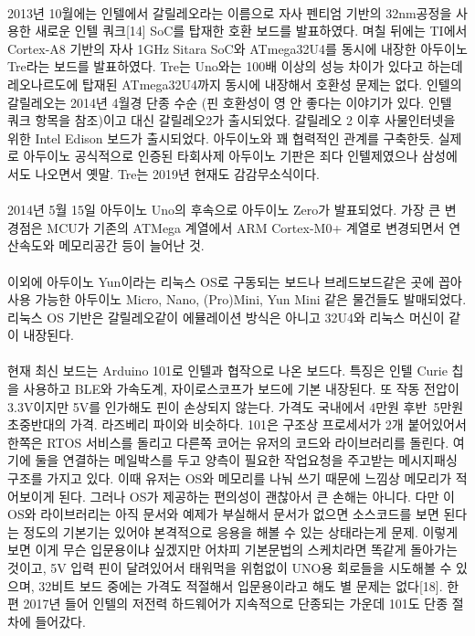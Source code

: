 \documentclass[12pt, a4paper, oneside]{book}
\begin{document}
\paragraph{}
2013년 10월에는 인텔에서 갈릴레오라는 이름으로 자사 펜티엄 기반의 32nm공정을 사용한 새로운 인텔 쿼크[14] SoC를 탑재한 호환 보드를 발표하였다. 
며칠 뒤에는 TI에서 Cortex-A8 기반의 자사 1GHz Sitara SoC와 ATmega32U4를 동시에 내장한 아두이노 Tre라는 보드를 발표하였다. 
Tre는 Uno와는 100배 이상의 성능 차이가 있다고 하는데 레오나르도에 탑재된 ATmega32U4까지 동시에 내장해서 호환성 문제는 없다. 
인텔의 갈릴레오는 2014년 4월경 단종 수순 (핀 호환성이 영 안 좋다는 이야기가 있다. 인텔 쿼크 항목을 참조)이고 대신 갈릴레오2가 출시되었다. 
갈릴레오 2 이후 사물인터넷을 위한 Intel Edison 보드가 출시되었다. 아두이노와 꽤 협력적인 관계를 구축한듯. 실제로 아두이노 공식적으로 인증된 타회사제 아두이노 기판은 죄다 인텔제였으나 삼성에서도 나오면서 옛말. Tre는 2019년 현재도 감감무소식이다.


\paragraph{}
2014년 5월 15일 아두이노 Uno의 후속으로 아두이노 Zero가 발표되었다. 
가장 큰 변경점은 MCU가 기존의 ATMega 계열에서 ARM Cortex-M0+ 계열로 변경되면서 연산속도와 메모리공간 등이 늘어난 것.

\paragraph{}
이외에 아두이노 Yun이라는 리눅스 OS로 구동되는 보드나 브레드보드같은 곳에 꼽아 사용 가능한 아두이노 Micro, Nano, (Pro)Mini, Yun Mini 같은 물건들도 발매되었다. 
리눅스 OS 기반은 갈릴레오같이 에뮬레이션 방식은 아니고 32U4와 리눅스 머신이 같이 내장된다.

\paragraph{}
현재 최신 보드는 Arduino 101로 인텔과 협작으로 나온 보드다. 특징은 인텔 Curie 칩을 사용하고 BLE와 가속도계, 자이로스코프가 보드에 기본 내장된다. 
또 작동 전압이 3.3V이지만 5V를 인가해도 핀이 손상되지 않는다. 
가격도 국내에서 4만원 후반~5만원 초중반대의 가격. 라즈베리 파이와 비슷하다.  
101은 구조상 프로세서가 2개 붙어있어서 한쪽은 RTOS 서비스를 돌리고 다른쪽 코어는 유저의 코드와 라이브러리를 돌린다. 여기에 둘을 연결하는 메일박스를 두고 양측이 필요한 작업요청을 주고받는 메시지패싱 구조를 가지고 있다. 
이때 유저는 OS와 메모리를 나눠 쓰기 때문에 느낌상 메모리가 적어보이게 된다. 그러나 OS가 제공하는 편의성이 괜찮아서 큰 손해는 아니다. 
다만 이 OS와 라이브러리는 아직 문서와 예제가 부실해서 문서가 없으면 소스코드를 보면 된다는 정도의 기본기는 있어야 본격적으로 응용을 해볼 수 있는 상태라는게 문제. 이렇게보면 이게 무슨 입문용이냐 싶겠지만 어차피 기본문법의 스케치라면 똑같게 돌아가는 것이고, 5V 입력 핀이 달려있어서 태워먹을 위험없이 UNO용 회로들을 시도해볼 수 있으며, 32비트 보드 중에는 가격도 적절해서 입문용이라고 해도 별 문제는 없다[18]. 한편 2017년 들어 인텔의 저전력 하드웨어가 지속적으로 단종되는 가운데 101도 단종 절차에 들어갔다.
\end{document}
